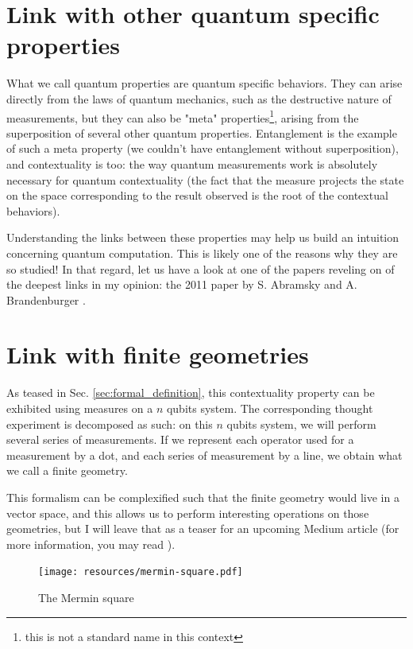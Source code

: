 \documentclass{article}
\begin{document}
\section{Link with other quantum specific properties}
\label{sec:link_with_other_quantum_specific_properties}

What we call quantum properties are quantum specific behaviors. They can arise
directly from the laws of quantum mechanics, such as the destructive nature of
measurements, but they can also be "meta" properties\footnote{this is not a
standard name in this context}, arising from the superposition of several other
quantum properties. Entanglement is the example of such a meta property
(we couldn't have entanglement without superposition), and contextuality is too:
the way quantum measurements work is absolutely necessary for quantum
contextuality (the fact that the measure projects the state on the space
corresponding to the result observed is the root of the contextual behaviors).

Understanding the links between these properties may help us build an intuition
concerning quantum computation. This is likely one of the reasons why they are
so studied! In that regard, let us have a look at one of the papers reveling on
of the deepest links in my opinion: the 2011 paper by S. Abramsky and A.
Brandenburger \cite{AB11}.

\section{Link with finite geometries}
\label{sec:link_with_finite_geometries}

As teased in Sec. \ref{sec:formal_definition}, this contextuality property can
be exhibited using measures on a $n$ qubits system. The corresponding thought
experiment is decomposed as such: on this $n$ qubits system, we will perform
several series of measurements. If we represent each operator used for a
measurement by a dot, and each series of measurement by a line, we obtain what we
call a finite geometry. 

This formalism can be complexified such that the finite geometry would live in a
vector space, and this allows us to perform interesting operations on those
geometries, but I will leave that as a teaser for an upcoming Medium article
(for more information, you may read \cite{dHG+22}).

\begin{figure}[!ht]
\centerline{\texttt{[image: resources/mermin-square.pdf]}}
\caption{The Mermin square}
\label{fig:mermin-square}
\end{figure}
\end{document}
